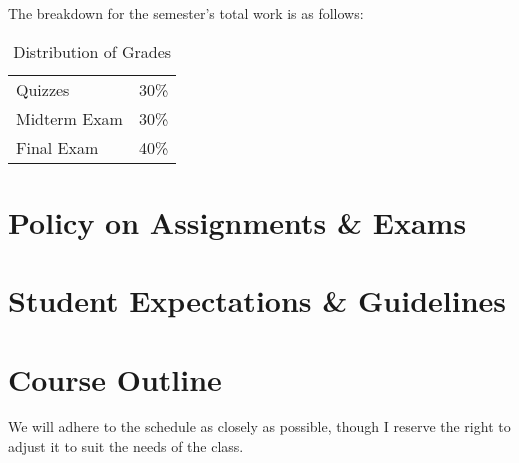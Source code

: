 \documentclass[titlepage]{article}
\newcommand\policy{../policy}
\begin{document}
The breakdown for the semester's total work is as follows:

\begin{table}[htbp]
  \centering
  {\lining
  \begin{tabular}{lr}
    \toprule
    Quizzes      & 30\% \\
    Midterm Exam & 30\% \\
    Final Exam   & 40\% \\
    \bottomrule
  \end{tabular}}
  \caption{Distribution of Grades}
  \label{distribution}
\end{table}



\section{Policy on Assignments \& Exams}
\label{policy}





\section{Student Expectations \& Guidelines}
\label{expectations}







\section{Course Outline}
\label{outline}

We will adhere to the schedule as closely as possible, though I reserve
the right to adjust it to suit the needs of the class.
\end{document}
